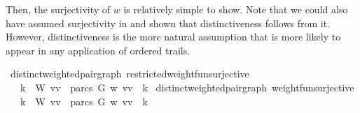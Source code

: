 \begin{isabellebody}
\begin{isamarkuptext}
Then, the surjectivity of $w$ is relatively simple to show. Note that we could also have assumed surjectivity in 
 and shown that distinctiveness follows from it. However,
distinctiveness is the more natural assumption that is more likely to appear in any application
of ordered trails.%
\end{isamarkuptext}\isamarkuptrue%
\isamarkupfalse%
{\isacharparenleft}\ distinct{\isacharunderscore}weighted{\isacharunderscore}pair{\isacharunderscore}graph{\isacharparenright}\ restricted{\isacharunderscore}weight{\isacharunderscore}fun{\isacharunderscore}surjective{\isacharcolon}\ \ \isanewline
\ \ \ {\isachardoublequoteopen}{\isacharparenleft}{\isasymforall}k\ {\isasymin}\ W{\isachardot}\ {\isasymexists}{\isacharparenleft}vv\ {\isasymin}\ {\isacharparenleft}parcs\ G{\isacharparenright}{\isachardot}\ w\ {\isacharparenleft}vv\ {\isacharequal}\ k{\isacharparenright}{\isachardoublequoteclose}%
\isadelimproof
%
\endisadelimproof
%
\isatagproof
%
\endisatagproof
{\isafoldproof}%
%
\isadelimproof
%
\endisadelimproof
\isanewline
\isanewline
{}\isamarkupfalse%
{\isacharparenleft}\ distinct{\isacharunderscore}weighted{\isacharunderscore}pair{\isacharunderscore}graph{\isacharparenright}\ weight{\isacharunderscore}fun{\isacharunderscore}surjective{\isacharcolon}\isanewline
\ \ \ {\isachardoublequoteopen}{\isacharparenleft}{\isasymforall}k\ {\isasymin}\ W{\isachardot}\ {\isasymexists}{\isacharparenleft}vv\ {\isasymin}\ {\isacharparenleft}parcs\ G{\isacharparenright}{\isachardot}\ w\ {\isacharparenleft}vv\ {\isacharequal}\ k{\isacharparenright}{\isachardoublequoteclose}%
\isadelimproof
%
\endisadelimproof
%
\isatagproof
%
\endisatagproof
{\isafoldproof}%
%
\isadelimproof
%
\endisadelimproof
%
\isadelimproof
%
\endisadelimproof
%
\isatagproof
%
\endisatagproof
{\isafoldproof}%
%
\isadelimproof
%
\endisadelimproof
%
\isadelimproof
%
\endisadelimproof
%
\isatagproof
%
\endisatagproof
{\isafoldproof}%
%
\isadelimproof
%
\endisadelimproof
%
\isadelimproof
%
\endisadelimproof
%
\isatagproof
%
\endisatagproof
{\isafoldproof}%

\end{isabellebody}
